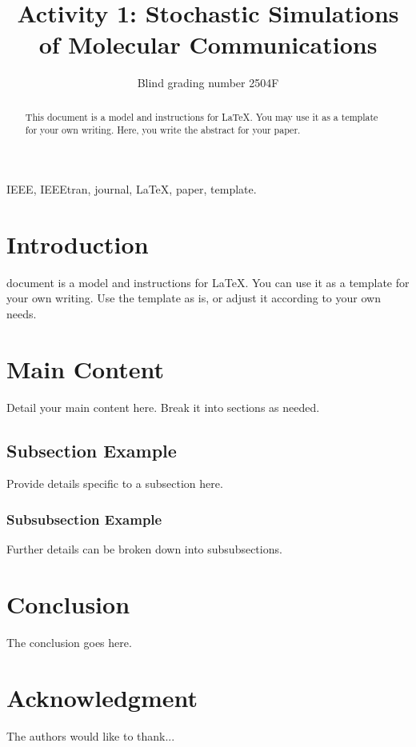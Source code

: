 \documentclass[journal]{IEEEtran}
\begin{document}
\title{Activity 1: Stochastic Simulations of Molecular Communications }

\author{Blind grading number 2504F}


\maketitle

\begin{abstract}
This document is a model and instructions for \LaTeX.
You may use it as a template for your own writing. Here, you write the abstract for your paper.
\end{abstract}

\begin{IEEEkeywords}
IEEE, IEEEtran, journal, \LaTeX, paper, template.
\end{IEEEkeywords}

\section{Introduction}
 document is a model and instructions for \LaTeX.
You can use it as a template for your own writing. Use the template as is, or adjust it according to your own needs.

\section{Main Content}
Detail your main content here. Break it into sections as needed.

\subsection{Subsection Example}
Provide details specific to a subsection here.

\subsubsection{Subsubsection Example}
Further details can be broken down into subsubsections.

\section{Conclusion}
The conclusion goes here.


\section*{Acknowledgment}

The authors would like to thank...




\end{document}
